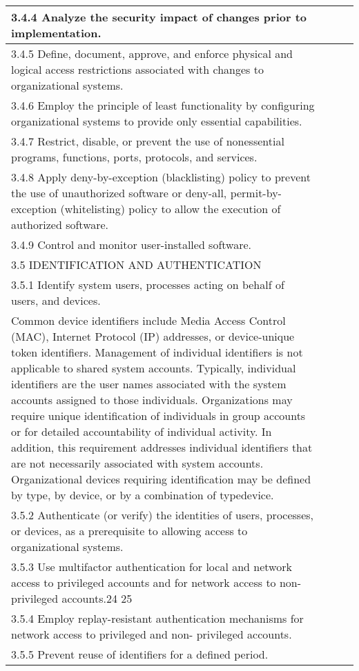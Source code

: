 \begin{longtable} {|p{}|p{}|p{}|p{} |}
{3.4.4 Analyze the security impact of changes prior to implementation.}&&& \\ \hline
{3.4.5 Define, document, approve, and enforce physical and logical access restrictions associated with changes to organizational systems.}&&& \\ \hline
{3.4.6 Employ the principle of least functionality by configuring organizational systems to provide only essential capabilities.}&&& \\ \hline
{3.4.7 Restrict, disable, or prevent the use of nonessential programs, functions, ports, protocols, and services.}&&& \\ \hline
{3.4.8 Apply deny-by-exception (blacklisting) policy to prevent the use of unauthorized software or deny-all, permit-by-exception (whitelisting) policy to allow the execution of authorized software.}&&& \\ \hline
{3.4.9 Control and monitor user-installed software.}&&& \\ \hline
{3.5 IDENTIFICATION AND AUTHENTICATION}&&& \\ \hline
{3.5.1 Identify system users, processes acting on behalf of users, and devices.}&&& \\ \hline
{Common device identifiers include Media Access Control (MAC), Internet Protocol (IP) addresses, or device-unique token identifiers. Management of individual identifiers is not applicable to shared system accounts. Typically, individual identifiers are the user names associated with the system accounts assigned to those individuals. Organizations may require unique identification of individuals in group accounts or for detailed accountability of individual activity. In addition, this requirement addresses individual identifiers that are not necessarily associated with system accounts. Organizational devices requiring identification may be defined by type, by device, or by a combination of type\/device.}&&& \\ \hline
{3.5.2 Authenticate (or verify) the identities of users, processes, or devices, as a prerequisite to allowing access to organizational systems.}&&& \\ \hline
{3.5.3 Use multifactor authentication for local and network access to privileged accounts and for network access to non-privileged accounts.24 25}&&& \\ \hline
{3.5.4 Employ replay-resistant authentication mechanisms for network access to privileged and non- privileged accounts.}&&& \\ \hline
{3.5.5 Prevent reuse of identifiers for a defined period.}&&& \\ \hline

\end{longtable}
